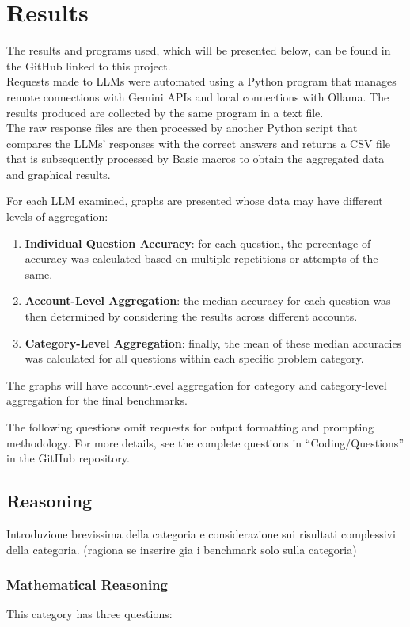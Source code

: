 \documentclass[12pt]{article}
\begin{document}
\clearpage
\section{Results}

The results and programs used, which will be presented below, can be found in the GitHub linked to this project. \\
Requests made to LLMs were automated using a Python program that manages remote connections with Gemini APIs and local connections with Ollama. The results produced are collected by the same program in a text file.\\
The raw response files are then processed by another Python script that compares the LLMs' responses with the correct answers and returns a CSV file that is subsequently processed by Basic macros to obtain the aggregated data and graphical results.

For each LLM examined, graphs are presented whose data may have different levels of aggregation:
\begin{enumerate}
\item \textbf{Individual Question Accuracy}: for each question, the percentage of accuracy was calculated based on multiple repetitions or attempts of the same.
\item \textbf{Account-Level Aggregation}: the median accuracy for each question was then determined by considering the results across different accounts.
\item \textbf{Category-Level Aggregation}: finally, the mean of these median accuracies was calculated for all questions within each specific problem category.
\end{enumerate}
The graphs will have account-level aggregation for category and category-level aggregation for the final benchmarks.

The following questions omit requests for output formatting and prompting methodology. For more details, see the complete questions in “Coding/Questions” in the GitHub repository.\\

\subsection{Reasoning}
Introduzione brevissima della categoria e considerazione sui risultati complessivi della categoria. (ragiona se inserire gia i  benchmark solo sulla categoria)
\subsubsection{Mathematical Reasoning} %
This category has three questions:
\end{document}
